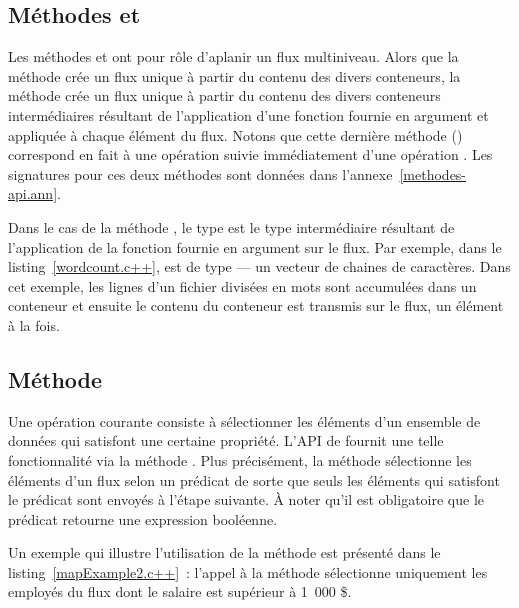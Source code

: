 \subsection{M\'ethodes  et }

Les m\'ethodes  et  ont pour r\^ole d'aplanir un flux multiniveau. Alors que la m\'ethode  cr\'ee un flux unique \`a partir du contenu des divers conteneurs, la m\'ethode  cr\'ee un flux unique \`a partir du contenu des divers conteneurs interm\'ediaires r\'esultant de l'application d'une fonction fournie en argument et appliquée \`a chaque \'el\'ement du flux. Notons que cette derni\`ere m\'ethode () correspond en fait à une op\'eration  suivie immédiatement d'une opération . Les signatures pour ces deux m\'ethodes sont donn\'ees dans l'annexe~\ref{methodes-api.ann}.


Dans le cas de la m\'ethode , le type  est le type interm\'ediaire r\'esultant de l'application de la fonction  fournie en argument sur le flux. Par exemple, dans le listing~\ref{wordcount.c++},  est de type  --- un vecteur de chaines de caract\`eres. Dans cet exemple, les lignes d'un fichier divis\'ees en mots sont accumul\'ees dans un conteneur et ensuite le contenu du conteneur est transmis sur le flux, un élément à la fois.


\subsection{M\'ethode }
Une op\'eration courante consiste \`a s\'electionner les \'el\'ements d'un ensemble de donn\'ees qui satisfont une certaine propri\'et\'e. L'API de  fournit une telle fonctionnalit\'e via la m\'ethode . Plus précisément, la m\'ethode  s\'electionne les \'el\'ements d'un flux selon un pr\'edicat de sorte que seuls les \'el\'ements qui  satisfont le pr\'edicat sont envoy\'es \`a l'\'etape suivante. \`A noter qu'il est obligatoire que le pr\'edicat retourne une expression bool\'eenne. 

Un exemple qui illustre l'utilisation de la m\'ethode  est pr\'esent\'e dans le listing~\ref{mapExample2.c++}~: l'appel \`a la m\'ethode   s\'electionne uniquement les employ\'es du flux dont le salaire est sup\'erieur \`a 1~000 \$.


